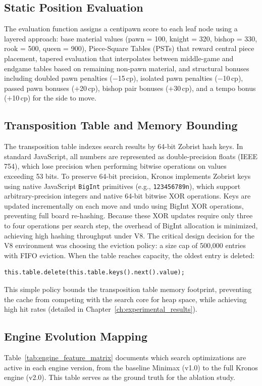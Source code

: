 \subsection{Static Position Evaluation}
The evaluation function assigns a centipawn score to each leaf node using a layered approach: base material values (pawn = 100, knight = 320, bishop = 330, rook = 500, queen = 900), Piece-Square Tables (PSTs) that reward central piece placement, tapered evaluation that interpolates between middle-game and endgame tables based on remaining non-pawn material, and structural bonuses including doubled pawn penalties ($-$15\,cp), isolated pawn penalties ($-$10\,cp), passed pawn bonuses ($+$20\,cp), bishop pair bonuses ($+$30\,cp), and a tempo bonus ($+$10\,cp) for the side to move.

\subsection{Transposition Table and Memory Bounding}
The transposition table indexes search results by 64-bit Zobrist hash keys. In standard JavaScript, all numbers are represented as double-precision floats (IEEE 754), which lose precision when performing bitwise operations on values exceeding 53 bits. To preserve 64-bit precision, Kronos implements Zobrist keys using native JavaScript \texttt{BigInt} primitives (e.g., \texttt{123456789n}), which support arbitrary-precision integers and native 64-bit bitwise XOR operations. Keys are updated incrementally on each move and undo using BigInt XOR operations, preventing full board re-hashing. Because these XOR updates require only three to four operations per search step, the overhead of BigInt allocation is minimized, achieving high hashing throughput under V8. The critical design decision for the V8 environment was choosing the eviction policy: a size cap of 500,000 entries with FIFO eviction. When the table reaches capacity, the oldest entry is deleted:
\begin{verbatim}
this.table.delete(this.table.keys().next().value);
\end{verbatim}
This simple policy bounds the transposition table memory footprint, preventing the cache from competing with the search core for heap space, while achieving high hit rates (detailed in Chapter~\ref{ch:experimental_results}).

\subsection{Engine Evolution Mapping}
Table~\ref{tab:engine_feature_matrix} documents which search optimizations are active in each engine version, from the baseline Minimax (v1.0) to the full Kronos engine (v2.0). This table serves as the ground truth for the ablation study.

